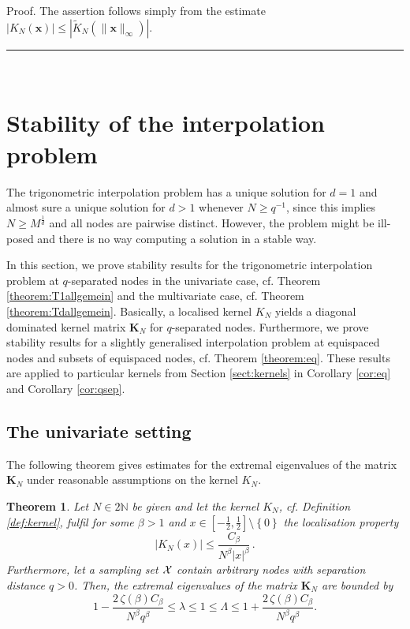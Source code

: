 \documentclass[11pt,a4paper,bibtotoc]{scrartcl}
\newcommand{\zb}[1]{\ensuremath{\boldsymbol{#1}}}
\renewcommand{\Box}{\hspace*{0ex} \hfill \rule{1.5ex}{1.5ex} \\ \goodbreak}
\newtheorem{theorem}{Theorem}[section]
\newenvironment{Theorem}{\goodbreak \begin{theorem}\sl}{\end{theorem}}
\numberwithin{equation}{section}
\numberwithin{table}{section}
\numberwithin{figure}{section}
\begin{document}
Proof.
The assertion follows simply from the estimate $|K_N(\zb x)| \le |\tilde
K_N(\|\zb x\|_{\infty})|$. \Box

\section{Stability of the interpolation problem}
The trigonometric interpolation problem has a unique solution for $d=1$ and
almost sure a unique solution for $d>1$ whenever $N\ge q^{-1}$, since this
implies $N\ge M^{\frac{1}{d}}$ and all nodes are pairwise distinct.
However, the problem might be ill-posed and there is no way computing a
solution in a stable way.

In this section, we prove stability results for the trigonometric
interpolation problem at $q$-separated nodes in the univariate case,
cf. Theorem \ref{theorem:T1allgemein} and the multivariate case, cf. Theorem
\ref{theorem:Tdallgemein}.
Basically, a localised kernel $K_N$ yields a diagonal dominated kernel matrix
$\zb K_N$ for $q$-separated nodes.
Furthermore, we prove stability results for a slightly generalised
interpolation problem at equispaced nodes and subsets of equispaced nodes,
cf. Theorem \ref{theorem:eq}.
These results are applied to particular kernels from Section
\ref{sect:kernels} in Corollary \ref{cor:eq} and Corollary \ref{cor:qsep}.

\subsection*{The univariate setting}
The following theorem gives estimates for the extremal eigenvalues of the
matrix $\zb K_N$ under reasonable assumptions on the kernel $K_N$.
\begin{Theorem} \label{theorem:T1allgemein}
  Let $N \in 2\mathbb{N}$ be given and let the kernel $K_N$, cf. Definition
  \ref{def:kernel}, fulfil for some $\beta> 1$ and
  $x\in\left[-\frac{1}{2},\frac{1}{2}\right]\setminus \left\{0\right\}$ 
  the localisation property
  \begin{equation*}
    \left| K_N\left(x\right)\right| \le \frac{C_{\beta}}{ N^{\beta}
      |x|^{\beta}}\,.
  \end{equation*}
  Furthermore, let a sampling set ${\cal X}$ contain arbitrary nodes with
  separation distance $q>0$.
  Then, the extremal eigenvalues of the matrix $\zb K_N$ are bounded by
  \begin{equation*}
    1 -  \frac{2\, \zeta\left(\beta\right) C_{\beta}}{N^{\beta} q^{\beta}}
    \le \lambda \le 1 \le \Lambda \le
    1 + \frac{2\, \zeta\left(\beta\right) C_{\beta}}{N^{\beta}  q^{\beta}}.
  \end{equation*}
\end{Theorem}
\end{document}
